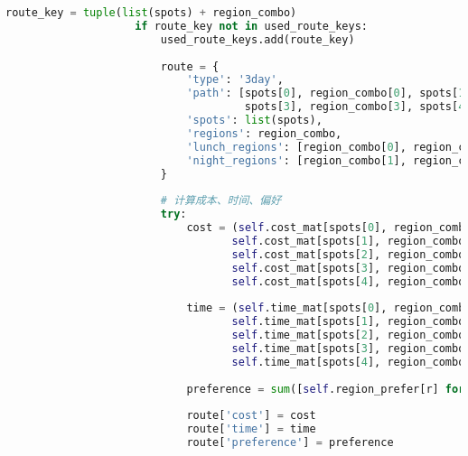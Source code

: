 \begin{lstlisting}[language=Python]
                    route_key = tuple(list(spots) + region_combo)
                    if route_key not in used_route_keys:
                        used_route_keys.add(route_key)
                        
                        route = {
                            'type': '3day',
                            'path': [spots[0], region_combo[0], spots[1], region_combo[1], spots[2], region_combo[2], 
                                     spots[3], region_combo[3], spots[4], region_combo[4], spots[5]],
                            'spots': list(spots),
                            'regions': region_combo,
                            'lunch_regions': [region_combo[0], region_combo[2], region_combo[4]],
                            'night_regions': [region_combo[1], region_combo[3]],
                        }
                        
                        # 计算成本、时间、偏好
                        try:
                            cost = (self.cost_mat[spots[0], region_combo[0]] + self.cost_mat[spots[1], region_combo[0]] +
                                   self.cost_mat[spots[1], region_combo[1]] + self.cost_mat[spots[2], region_combo[1]] +
                                   self.cost_mat[spots[2], region_combo[2]] + self.cost_mat[spots[3], region_combo[2]] +
                                   self.cost_mat[spots[3], region_combo[3]] + self.cost_mat[spots[4], region_combo[3]] +
                                   self.cost_mat[spots[4], region_combo[4]] + self.cost_mat[spots[5], region_combo[4]])
                            
                            time = (self.time_mat[spots[0], region_combo[0]] + self.time_mat[spots[1], region_combo[0]] +
                                   self.time_mat[spots[1], region_combo[1]] + self.time_mat[spots[2], region_combo[1]] +
                                   self.time_mat[spots[2], region_combo[2]] + self.time_mat[spots[3], region_combo[2]] +
                                   self.time_mat[spots[3], region_combo[3]] + self.time_mat[spots[4], region_combo[3]] +
                                   self.time_mat[spots[4], region_combo[4]] + self.time_mat[spots[5], region_combo[4]])
                            
                            preference = sum([self.region_prefer[r] for r in region_combo]) + 6
                            
                            route['cost'] = cost
                            route['time'] = time
                            route['preference'] = preference
                            

\end{lstlisting}
